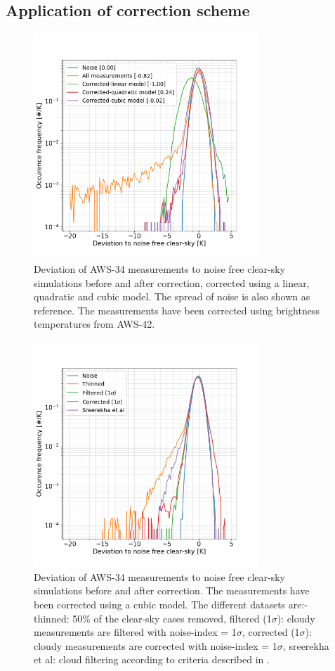 \documentclass[12pt]{article}
\begin{document}
\subsection{Application of correction scheme}
\begin{figure}[!th]
	\centering
	\includegraphics[clip,trim=0 0 0 0,height=85mm]{PDF_corrected_AWS-34_AWS-42}
	\caption{Deviation of AWS-34 measurements to noise free clear-sky simulations before and after correction, corrected using a linear, quadratic and cubic model. The spread of noise is also shown as reference. The measurements have been corrected using brightness temperatures from AWS-42. }
	\label{fig:correction:c34-42}
\end{figure}
%

\begin{figure}[!tb]
	\centering
	\includegraphics[height=85mm]{PDF_corrected_AWS-34_AWS-42_thinned}
	\caption{Deviation of AWS-34 measurements to noise free clear-sky simulations before and after correction. The measurements have been corrected using a cubic model. The different datasets are:- thinned: 50\% of the clear-sky cases removed, filtered (1$\sigma$): cloudy measurements are filtered with noise-index = 1$\sigma$,   corrected (1$\sigma$): cloudy measurements are corrected with noise-index = 1$\sigma$, sreerekha et al: cloud filtering according to criteria described in \cite{rekha2012potential}.}
	\label{fig:correction:c34-42:thinned}
\end{figure}
%
\end{document}

